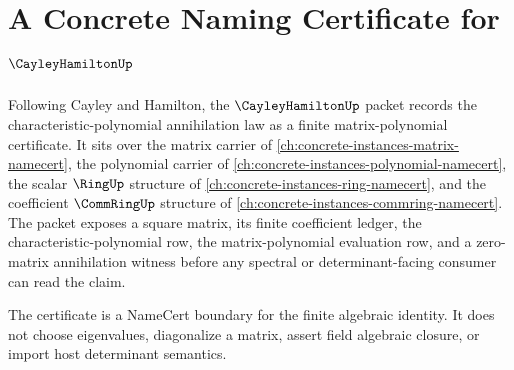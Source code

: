 \chapter{A Concrete Naming Certificate for $\CayleyHamiltonUp$}
\label{ch:concrete-instances-cayley-hamilton-namecert}

Following Cayley and Hamilton, the $\CayleyHamiltonUp$ packet records the characteristic-polynomial annihilation law as a finite matrix-polynomial certificate. It sits over the matrix carrier of \autoref{ch:concrete-instances-matrix-namecert}, the polynomial carrier of \autoref{ch:concrete-instances-polynomial-namecert}, the scalar $\RingUp$ structure of \autoref{ch:concrete-instances-ring-namecert}, and the coefficient $\CommRingUp$ structure of \autoref{ch:concrete-instances-commring-namecert}. The packet exposes a square matrix, its finite coefficient ledger, the characteristic-polynomial row, the matrix-polynomial evaluation row, and a zero-matrix annihilation witness before any spectral or determinant-facing consumer can read the claim.

The certificate is a NameCert boundary for the finite algebraic identity. It does not choose eigenvalues, diagonalize a matrix, assert field algebraic closure, or import host determinant semantics.

